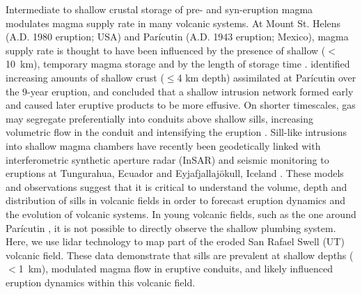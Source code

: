 \documentclass[12pt,letter]{article}
\begin{document}
Intermediate to shallow crustal storage of pre- and syn-eruption magma modulates magma supply rate in many volcanic systems. At Mount St. Helens (A.D. 1980 eruption; USA) and Parícutin (A.D. 1943 eruption; Mexico), magma supply rate is thought to have been influenced by the presence of shallow ($<$10~km), temporary magma storage \citep{cashman2005multiple} and by the length of storage time \citep{scandone2007magma}. \citet{erlund2010compositional} identified increasing amounts of shallow crust ($\le$4 km depth) assimilated at Parícutin over the 9-year eruption, and concluded that a shallow intrusion network formed early and caused later eruptive products to be more effusive. On shorter timescales, gas may segregate preferentially into conduits above shallow sills, increasing volumetric flow in the conduit and intensifying the eruption \citep{conte2000experimental,pioli2009controls}. Sill-like intrusions into shallow magma chambers have recently been geodetically linked with interferometric synthetic aperture radar (InSAR) and seismic monitoring to eruptions at Tungurahua, Ecuador \citep{biggs2010stratovolcano} and Eyjafjallaj\"{o}kull, Iceland \citep{tarasewicz2012magma}. These models and observations suggest that it is critical to understand the volume, depth and distribution of sills in volcanic fields in order to forecast eruption dynamics and the evolution of volcanic systems. In young volcanic fields, such as the one around Parícutin \citep{connor1990cinder}, it is not possible to directly observe the shallow plumbing system. Here, we use lidar technology to map part of the eroded San Rafael Swell (UT) volcanic field. These data demonstrate that sills are prevalent at shallow depths ($<$1~km), modulated magma flow in eruptive conduits, and likely influenced eruption dynamics within this volcanic field.
\end{document}
